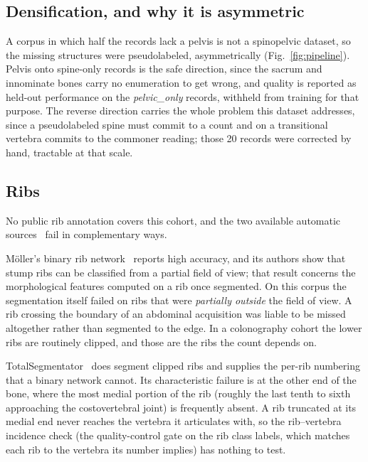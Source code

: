 \documentclass[aapm,mph,amsmath,amssymb,reprint]{revtex4-2}
\begin{document}
\subsection{Densification, and why it is asymmetric}

A corpus in which half the records lack a pelvis is not a spinopelvic dataset, so the
missing structures were pseudolabeled, asymmetrically (Fig.~\ref{fig:pipeline}). Pelvis
onto spine-only records is the safe direction, since the sacrum and innominate bones carry no
enumeration to get wrong, and quality is reported as held-out performance on the
\emph{pelvic\_only} records, withheld from training for that purpose. The reverse direction
carries the whole problem this dataset addresses, since a pseudolabeled spine must commit to
a count and on a transitional vertebra commits to the commoner reading; those 20 records were
corrected by hand, tractable at that scale.

\subsection{Ribs}

No public rib annotation covers this cohort, and the two available automatic
sources~\cite{moller2026,totalsegmentator} fail in complementary ways.

Möller's binary rib network~\cite{moller2026} reports high accuracy, and its authors show
that stump ribs can be classified from a partial field of view; that result concerns the
morphological features computed on a rib once segmented. On this corpus the segmentation
itself failed on ribs that were \emph{partially outside} the field of view. A rib crossing
the boundary of an abdominal acquisition was liable to be missed altogether rather than
segmented to the edge.  In a colonography cohort the lower ribs are routinely clipped, and
those are the ribs the count depends on.

TotalSegmentator~\cite{totalsegmentator} does segment clipped ribs and supplies the
per-rib numbering that a binary network cannot. Its characteristic failure is at the other end of the bone, where the most medial portion of the rib (roughly the last tenth to sixth
approaching the costovertebral joint) is frequently absent. A rib truncated at its
medial end never reaches the vertebra it articulates with, so the rib--vertebra incidence
check (the quality-control gate on the rib class labels, which matches each rib to the
vertebra its number implies) has nothing to test.
\end{document}
